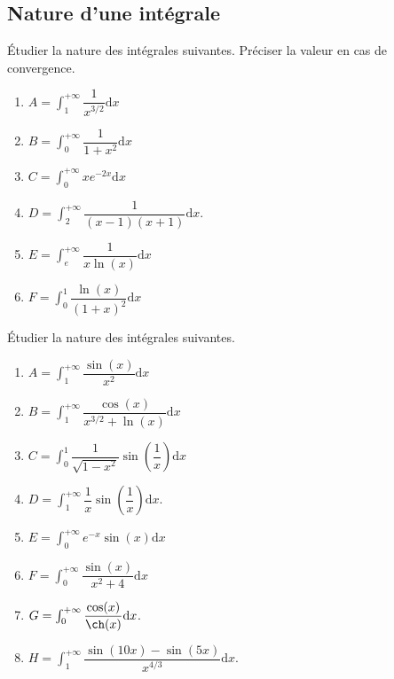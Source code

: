 \documentclass[a4paper,twoside,french,11pt]{VcCours}
\newcommand{\dx}{\text{d}x}
\begin{document}

\tableofcontents
\separationTitre

\subsection{Nature d'une intégrale}

\begin{Exercice}{}
Étudier la nature des intégrales suivantes. Préciser la valeur en cas de convergence.
\begin{multicols}{2}
\begin{enumerate}
\item $A = \int_1^{+ \infty} \dfrac{1}{x^{3/2}} \dx$
\item $B = \int_0^{+ \infty} \dfrac{1}{1+x^2} \dx$
\item $C = \int_0^{+ \infty} x e^{-2x} \dx$
\item $D= \int_2^{+ \infty} \dfrac{1}{(x-1)(x+1)} \dx$.
\item $E= \int_{e}^{+ \infty} \dfrac{1}{x\ln(x)} \dx$
\item $F= \int_0^1 \dfrac{\ln(x)}{(1+x)^2} \dx$
\end{enumerate}
\end{multicols}
\end{Exercice}


\begin{Exercice}{} Étudier la nature des intégrales suivantes. 
\begin{multicols}{2}
\begin{enumerate}
\item $A = \int_1^{+ \infty} \dfrac{\sin(x)}{x^2} \dx$
\item $B = \int_1^{+ \infty} \dfrac{\cos(x)}{x^{3/2}+\ln(x)} \dx$
\item $C = \int_0^{1} \dfrac{1}{\sqrt{1-x^2}} \sin \left(\dfrac{1}{x}\right) \dx$
\item $D= \int_1^{+ \infty} \dfrac{1}{x} \sin \left(\dfrac{1}{x}\right) \dx$.
\item $E= \int_{0}^{+ \infty} e^{-x} \sin(x) \dx$
\item $F= \int_0^{+\infty} \dfrac{\sin(x)}{x^2+4} \dx$
\item $G= \int_0^{+ \infty} \dfrac{\cos(x)}{\ch(x)} \dx$.
\item $H= \int_1^{+\infty} \dfrac{\sin(10x)-\sin(5x)}{x^{4/3}} \dx$.
\end{enumerate}
\end{multicols}
\end{Exercice}
\end{document}
